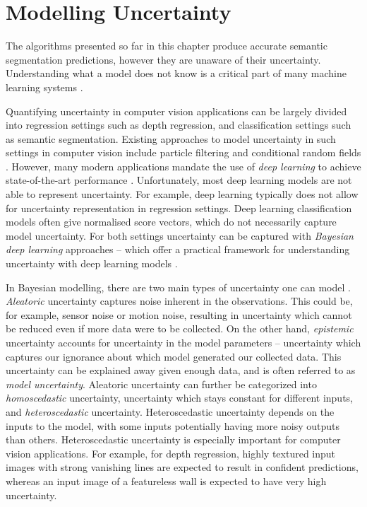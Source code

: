 \section{Modelling Uncertainty}
\label{seg_unc}

The algorithms presented so far in this chapter produce accurate semantic segmentation predictions, however they are unaware of their uncertainty. Understanding what a model does not know is a critical part of many machine learning systems \citep{ghahramani2015probabilistic}.

Quantifying uncertainty in computer vision applications can be largely divided into regression settings such as depth regression, and classification settings such as semantic segmentation.
Existing approaches to model uncertainty in such settings in computer vision include particle filtering and conditional random fields \citep{blake1993framework, he2004multiscale}. However, many modern applications mandate the use of \textit{deep learning} to achieve state-of-the-art performance \citep{he2016deep}. Unfortunately, most deep learning models are not able to represent uncertainty.
For example, deep learning typically does not allow for uncertainty representation in regression settings. Deep learning classification models often give normalised score vectors, which do not necessarily capture model uncertainty. For both settings uncertainty can be captured with \textit{Bayesian deep learning} \citep{denker1991transforming, mackay1992practical, neal1995bayesian} approaches --
which offer a practical framework for understanding uncertainty with deep learning models 
\citep{gal2016thesis}.

In Bayesian modelling, there are two main types of uncertainty one can model \citep{der2009aleatory}. \textit{Aleatoric} uncertainty captures noise inherent in the observations.
This could be, for example, sensor noise or motion noise, resulting in uncertainty which cannot be reduced even if more data were to be collected.
On the other hand, \textit{epistemic} uncertainty accounts for uncertainty in the model parameters -- uncertainty which captures our ignorance about which model generated our collected data. 
This uncertainty can be explained away given enough data, and is often referred to as \textit{model uncertainty}. Aleatoric uncertainty can further be categorized into \textit{homoscedastic} uncertainty, uncertainty which stays constant for different inputs, and \textit{heteroscedastic} uncertainty. Heteroscedastic uncertainty depends on the inputs to the model, with some inputs potentially having more noisy outputs than others. 
Heteroscedastic uncertainty is especially important for computer vision applications. For example, for depth regression, highly textured input images with strong vanishing lines are expected to result in confident predictions, whereas an input image of a featureless wall is expected to have very high uncertainty.

